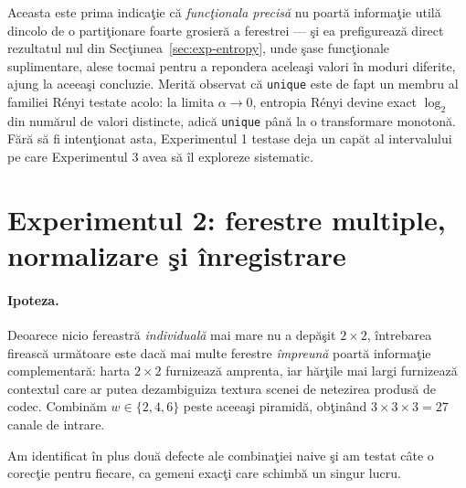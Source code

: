 Aceasta este prima indicaţie că \emph{funcţionala precisă} nu poartă informaţie
utilă dincolo de o partiţionare foarte grosieră a ferestrei --- şi ea prefigurează
direct rezultatul nul din Secţiunea~\ref{sec:exp-entropy}, unde şase funcţionale
suplimentare, alese tocmai pentru a repondera aceleaşi valori în moduri
diferite, ajung la aceeaşi concluzie. Merită observat că \texttt{unique} este de
fapt un membru al familiei Rényi testate acolo: la limita $\alpha \to 0$, entropia
Rényi devine exact $\log_2$ din numărul de valori distincte, adică
\texttt{unique} până la o transformare monotonă. Fără să fi intenţionat asta,
Experimentul 1 testase deja un capăt al intervalului pe care Experimentul 3 avea
să îl exploreze sistematic.

\section{Experimentul 2: ferestre multiple, normalizare şi înregistrare}
\label{sec:exp-multiwindow}

\paragraph{Ipoteza.} Deoarece nicio fereastră \emph{individuală} mai mare nu a
depăşit $2\times2$, întrebarea firească următoare este dacă mai multe ferestre
\emph{împreună} poartă informaţie complementară: harta $2\times2$ furnizează
amprenta, iar hărţile mai largi furnizează contextul care ar putea dezambiguiza
textura scenei de netezirea produsă de codec. Combinăm $w \in \{2,4,6\}$ peste
aceeaşi piramidă, obţinând $3 \times 3 \times 3 = 27$ canale de intrare.

Am identificat în plus două defecte ale combinaţiei naive şi am testat câte o
corecţie pentru fiecare, ca gemeni exacţi care schimbă un singur lucru.

